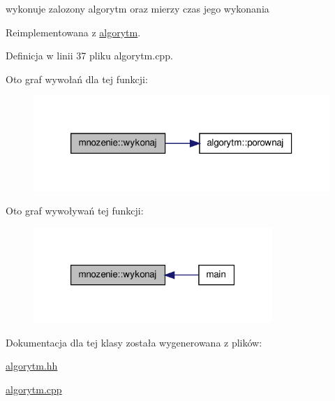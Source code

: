 wykonuje zalozony algorytm oraz mierzy czas jego wykonania 



\-Reimplementowana z \hyperlink{classalgorytm_a85ba543fad39e8987bbda4ee698b5fec}{algorytm}.



\-Definicja w linii 37 pliku algorytm.\-cpp.



\-Oto graf wywołań dla tej funkcji\-:
\nopagebreak
\begin{figure}[H]
\begin{center}
\leavevmode
\includegraphics[width=318pt]{classmnozenie_a2c5dc64610bb16af0ef18d142d6af2c0_cgraph}
\end{center}
\end{figure}




\-Oto graf wywoływań tej funkcji\-:
\nopagebreak
\begin{figure}[H]
\begin{center}
\leavevmode
\includegraphics[width=256pt]{classmnozenie_a2c5dc64610bb16af0ef18d142d6af2c0_icgraph}
\end{center}
\end{figure}




\-Dokumentacja dla tej klasy została wygenerowana z plików\-:\begin{DoxyCompactItemize}
\item 
\hyperlink{algorytm_8hh}{algorytm.\-hh}\item 
\hyperlink{algorytm_8cpp}{algorytm.\-cpp}\end{DoxyCompactItemize}
